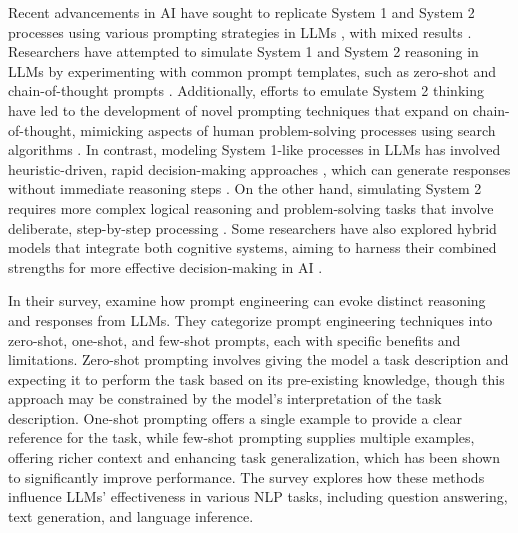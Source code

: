         Recent advancements in AI have sought to replicate System 1 and System 2 processes using various prompting strategies in LLMs \citep{Nye2021, kojima_large_2022, hagendorff_human-like_2023, weston_system_2023, saha_system-1x_2024, yu_distilling_2024}, with mixed results \citep{vatsal_survey_2024}. Researchers have attempted to simulate System 1 and System 2 reasoning in LLMs by experimenting with common prompt templates, such as zero-shot and chain-of-thought prompts \citep{kojima_large_2022, wei_chain_2022}. Additionally, efforts to emulate System 2 thinking have led to the development of novel prompting techniques that expand on chain-of-thought, mimicking aspects of human problem-solving processes using search algorithms \citep{wang_plan-and-solve_2023, wang_self-consistency_2023, yao_tree_2023, zhang_cumulative_2024}. In contrast, modeling System 1-like processes in LLMs has involved heuristic-driven, rapid decision-making approaches \citep{hagendorff_human-like_2023}, which can generate responses without immediate reasoning steps \citep{yu_distilling_2024}. On the other hand, simulating System 2 requires more complex logical reasoning and problem-solving tasks that involve deliberate, step-by-step processing \citep{Nye2021}. Some researchers have also explored hybrid models that integrate both cognitive systems, aiming to harness their combined strengths for more effective decision-making in AI \citep{saha_system-1x_2024}.

        In their survey, \citet{vatsal_survey_2024} examine how prompt engineering can evoke distinct reasoning and responses from LLMs. They categorize prompt engineering techniques into zero-shot, one-shot, and few-shot prompts, each with specific benefits and limitations. Zero-shot prompting involves giving the model a task description and expecting it to perform the task based on its pre-existing knowledge, though this approach may be constrained by the model's interpretation of the task description. One-shot prompting offers a single example to provide a clear reference for the task, while few-shot prompting supplies multiple examples, offering richer context and enhancing task generalization, which has been shown to significantly improve performance. The survey explores how these methods influence LLMs' effectiveness in various NLP tasks, including question answering, text generation, and language inference.
        
